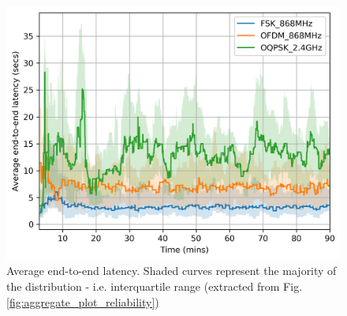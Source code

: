 \documentclass[journal]{IEEEtran}
\begin{document}

\begin{figure}
	\centering
	\includegraphics[width=0.90\columnwidth]{avg_latency_plot}
	\caption{Average end-to-end latency. Shaded curves represent the majority of the distribution - i.e. interquartile range (extracted from Fig. \ref{fig:aggregate_plot_reliability})}
    \label{fig:avg_latency_plot}
\end{figure}
\end{document}

